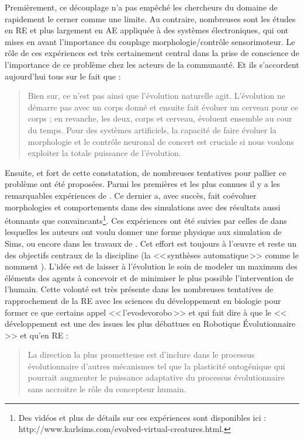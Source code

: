 Premièrement, ce découplage n'a pas empêché les chercheurs du domaine de rapidement le cerner comme une limite. Au contraire, nombreuses sont les études en RE et plus largement en AE appliquée à des systèmes électroniques, qui ont mises en avant l'importance du couplage morphologie/contrôle sensorimoteur. Le rôle de ces expériences est très certainement central dans la prise de conscience de l'importance de ce problème chez les acteurs de la communauté. Et ils s'accordent aujourd'hui tous sur le fait que :
\begin{quotation}
	Bien sur, ce n'est pas ainsi que l'évolution naturelle agit. L'évolution ne démarre pas avec un corps donné et ensuite fait évoluer un cerveau pour ce corps ; en revanche, les deux, corps et cerveau, évoluent ensemble au cour du temps. Pour des systèmes artificiels, la capacité de faire évoluer la morphologie et le contrôle neuronal de concert est cruciale si nous voulons exploiter la totale puissance de l'évolution.
	\\\citep[p. 193]{pfeifer2006howthebodyshapesthewaywethink}
\end{quotation}

Ensuite, et fort de cette constatation, de nombreuses tentatives pour pallier ce problème ont été proposées. Parmi les premières et les plus connues il y a les remarquables expériences de \cite{sims1994evolving3dmorphologyandbehaviorbycompetition}. Ce dernier a, avec succès, fait coévoluer morphologies et comportements dans des simulations avec des résultats aussi étonnants que convaincants\footnote{Des vidéos et plus de détails sur ces expériences sont disponibles ici : http://www.karlsims.com/evolved-virtual-creatures.html.}. Ces expériences ont été suivies par celles de \cite{pollack2000thegolemproject} dans lesquelles les auteurs ont voulu donner une forme physique aux simulation de Sims, ou encore dans les travaux de \citet[ch. 6]{pfeifer2006howthebodyshapesthewaywethink}.
Cet effort est toujours à l'œuvre et reste un des objectifs centraux de la discipline (la <<\,synthèses automatique\,>> comme le nomment \cite{doncieux2009exploringnewhorizonsinevolutionqryrobotics}). L'idée est de laisser à l'évolution le soin de modeler un maximum des éléments des agents à concevoir et de minimiser le plus possible l'intervention de l'humain. Cette volonté est très présente dans les nombreuses tentatives de rapprochement de la RE avec les sciences du développement en biologie pour former ce que certains appel <<\,l'evodevorobo\,>> \citep{bredeche11evolutionaryadaptationpopulationrobots} et qui fait dire à \citet[p. 17]{nolfi00evolrobobiolintetechselfmach} que le <<\,développement est une des issues les plus débattues en Robotique \'Evolutionnaire\,>> et qu'en RE :
\begin{quotation}
	La direction la plus prometteuse est d'inclure dans le processus évolutionnaire d'autres mécanismes tel que la plasticité ontogénique qui pourrait augmenter le puissance adaptative du processus évolutionnaire sans accroitre le rôle du concepteur humain.
\end{quotation}


